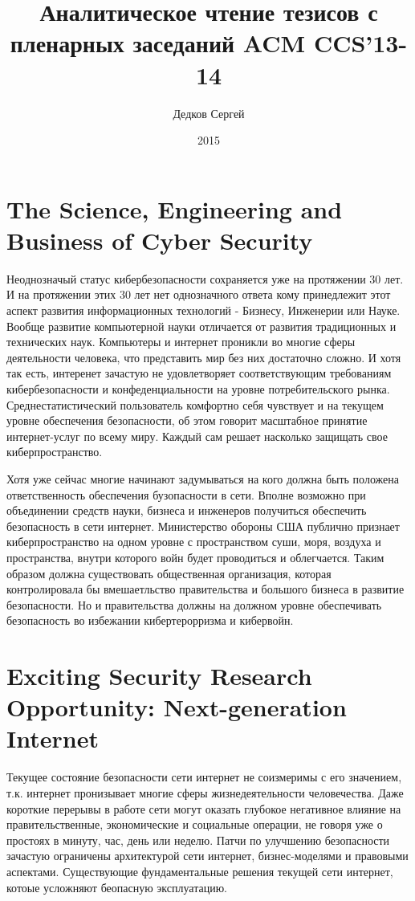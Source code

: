 \documentclass[11pt, a4paper]{article}		%
\author{Дедков Сергей}
\title{Аналитическое чтение тезисов с пленарных заседаний ACM CCS'13-14}
\date{2015}
\begin{document}
\maketitle
\tableofcontents
\newpage


\section{The Science, Engineering and Business of Cyber Security}

Неоднозначый статус кибербезопасности сохраняется уже на протяжении 30 лет. И на протяжении этих 30 лет нет однозначного ответа кому принедлежит этот аспект развития информационных технологий - Бизнесу, Инженерии или Науке. Вообще развитие компьютерной науки отличается от развития традиционных и технических наук. Компьютеры и интернет проникли во многие сферы деятельности человека, что представить мир без них достаточно сложно. И хотя так есть, интеренет зачастую не удовлетворяет соответствующим требованиям кибербезопасности и конфеденциальности на уровне потребительского рынка. Среднестатистический пользователь комфортно себя чувствует и на текущем уровне обеспечения безопасности, об этом говорит масштабное принятие интернет-услуг по всему миру. Каждый сам решает насколько защищать свое киберпространство. 

Хотя уже сейчас многие начинают задумываться на кого должна быть положена ответственность обеспечения бузопасности в сети. Вполне возможно при объединении средств науки, бизнеса и инженеров получиться обеспечить безопасность в сети интернет. Министерство обороны США публично
признает киберпространство на одном уровне с пространством суши, моря, воздуха и пространства, внутри которого войн будет проводиться
и облегчается. Таким образом должна существовать общественная организация, которая контролировала бы вмешаетльство правительства и большого бизнеса в развитие безопасности. Но и правительства должны на должном уровне обеспечивать безопасность во избежании кибертерорризма и кибервойн.



\section{Exciting Security Research Opportunity: Next-generation Internet}

Текущее состояние безопасности сети интернет не соизмеримы с его значением, т.к. интернет пронизывает многие сферы жизнедеятельности человечества. Даже короткие перерывы в работе сети могут оказать глубокое негативное влияние на правительственные, экономические и социальные операции, не говоря уже о простоях в минуту, час, день или неделю. Патчи по улучшению безопасности зачастую ограничены архитектурой сети интернет, бизнес-моделями и правовыми аспектами. Существующие фундаментальные решения текущей сети интернет, котоые усложняют беопасную эксплуатацию.
\end{document}
